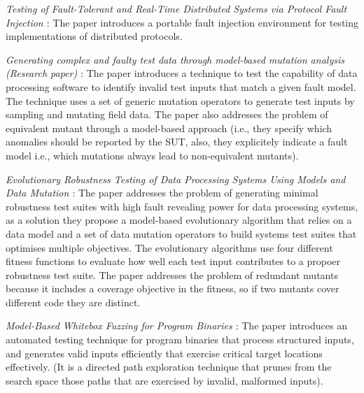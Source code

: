 \emph{Testing of Fault-Tolerant and Real-Time Distributed Systems via Protocol Fault Injection \cite{dawson1996testing}}: The paper introduces a portable fault injection environment for testing implementations of distributed protocols.

\emph{Generating complex and faulty test data through model-based mutation analysis (Research paper) \cite{di2015generating}}: The paper introduces a technique to test the capability of data processing software to identify invalid test inputs that match a given fault model. The technique uses a set of generic mutation operators to generate test inputs by sampling and mutating field data. The paper also addresses the problem of equivalent mutant through a model-based approach (i.e., they specify which anomalies should be reported by the SUT, also, they explicitely indicate a fault model i.e., which mutations always lead to non-equivalent mutants).

\emph{Evolutionary Robustness Testing of Data Processing Systems Using Models and Data Mutation \cite{di2015evolutionary}}: The paper addresses the problem of generating minimal robustness test suites with high fault revealing power for data processing systems, as a solution they propose a model-based evolutionary algorithm that relies on a data model and a set of data mutation operators to build systems test suites that optimises multiple objectives.
The evolutionary algorithms use four different fitness functions to evaluate how well each test input contributes to a propoer robustness test suite.
The paper addresses the problem of redundant mutants because it includes a coverage objective in the fitness, so if two mutants cover different code they are distinct.

\emph{Model-Based Whitebox Fuzzing for Program Binaries \cite{pham2016model}}: The paper introduces an automated testing technique for program binaries that process structured inputs, and generates valid inputs efficiently that exercise critical target locations effectively. (It is a directed path exploration technique that prunes from the search space those paths that are exercised by invalid, malformed inputs).